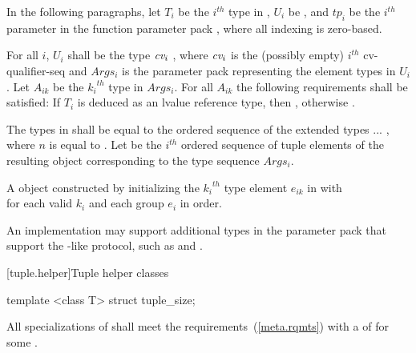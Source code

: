 \begin{itemdescr}
\pnum
In the following paragraphs, let $T_i$ be the $i^{th}$ type in ,
$U_i$ be , and $tp_i$ be the $i^{th}$
parameter in the function parameter pack , where all indexing is
zero-based.

\pnum
\requires For all $i$, $U_i$ shall be the type
$\textit{cv}_i$ , where $\textit{cv}_i$ is the (possibly empty) $i^{th}$
cv-qualifier-seq and $Args_i$ is the parameter pack representing the element
types in $U_i$. Let ${A_{ik}}$ be the ${k_i}^{th}$ type in $Args_i$. For all
$A_{ik}$ the following requirements shall be satisfied: If $T_i$ is
deduced as an lvalue reference type, then
, otherwise
.

\pnum
\remarks The types in  shall be equal to the ordered
sequence of the extended types
 ... , where $n$ is
equal to . Let  be the $i^{th}$
ordered sequence of tuple elements of the resulting  object
corresponding to the type sequence $Args_i$.

\pnum
\returns A  object constructed by initializing the ${k_i}^{th}$
type element $e_{ik}$ in  with\\
 for each valid $k_i$ and
each group $e_i$ in order.

\pnum
\realnote An implementation may support additional types in the parameter
pack  that support the -like protocol, such as
 and .
\end{itemdescr}

[tuple.helper]{Tuple helper classes}

%
\begin{itemdecl}
template <class T> struct tuple_size;
\end{itemdecl}

\begin{itemdescr}
\remarks All specializations of  shall meet the
 requirements~(\ref{meta.rqmts}) with a
 of 
for some .
\end{itemdescr}

